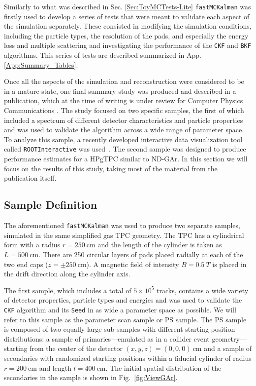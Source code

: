 Similarly to what was described in Sec. \ref{Sec:ToyMCTests-Lite} \texttt{fastMCKalman} was firstly used to develop a series of tests that were meant to validate each aspect of the simulation separately. These consisted in modifying the simulation conditions, including the particle types, the resolution of the pads, and especially the energy loss and multiple scattering and investigating the performance of the \texttt{CKF} and \texttt{BKF} algorithms. This series of tests are described summarized in App. \ref{App:Summary_Tables}. 

Once all the aspects of the simulation and reconstruction were considered to be in a mature state, one final summary study was produced and described in a publication, which at the time of writing is under review for Computer Physics Communications \cite{Battisti:2024nqq}. The study focused on two specific samples, the first of which included a spectrum of different detector characteristics and particle properties and was used to validate the algorithm across a wide range of parameter space. To analyze this sample, a recently developed interactive data visualization tool called \texttt{ROOTInteractive} was used~\cite{RootInt}. The second sample was designed to produce performance estimates for a HPgTPC similar to ND-GAr. In this section we will focus on the results of this study, taking most of the material from the publication itself.
\subsection{Sample Definition}
\label{sec:Sample_Definition}
The aforementioned \texttt{fastMCKalman} was used to produce two separate samples, simulated in the same simplified gas TPC geometry. The TPC has a cylindrical form with a radius $r=250 \ \text{cm}$ and the length of the cylinder is taken as $L=500 \ \text{cm}$. There are 250 circular layers of pads placed radially at each of the two end caps ($z=\pm250~\textrm{cm}$). A magnetic field of intensity $B=0.5 \ T$ is placed in the drift direction along the cylinder axis. 

The first sample, which includes a total of $5\times10^5$ tracks, contains a wide variety of detector properties, particle types and energies and was used to validate the \texttt{CKF} algorithm and its \texttt{Seed} in as wide a parameter space as possible. We will refer to this sample as the parameter scan sample or PS sample. The PS sample is composed of two equally large sub-samples with different starting position distributions: a sample of primaries---emulated as in a collider event geometry---starting from the center of the detector $(x,y,z)=(0,0,0)\ \text{cm}$ and a sample of secondaries with randomized starting positions within a fiducial cylinder of radius $r=200 \ \text{cm}$ and length $l = 400 \ \text{cm}$. The initial spatial distribution of the secondaries in the sample is shown in Fig.~\ref{fig:ViewGAr}.

